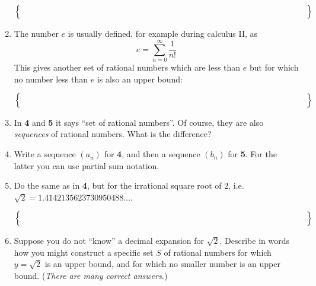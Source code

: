 \documentclass[11pt]{amsart}
\begin{document}
\begin{enumerate}[leftmargin=-1mm]
$$\Big\{ \hspace{5.0in} \Big\}$$
\vfill
\item The number $e$ is usually defined, for example during calculus II, as
	$$e = \sum_{n=0}^\infty \frac{1}{n!}$$
This gives another set of rational numbers which are less than $e$ but for which no number less than $e$ is also an upper bound:

$$\Big\{ \hspace{5.0in} \Big\}$$
\vfill
\clearpage\newpage
\item In \textbf{4} and \textbf{5} it says ``set of rational numbers''.  Of course, they are also \emph{sequences} of rational numbers.  What is the difference?

\vspace{1.0in}
\item Write a sequence $(a_n)$ for \textbf{4}, and then a sequence $(b_n)$ for \textbf{5}.  For the latter you can use partial sum notation.
\vfill
\item Do the same as in \textbf{4}, but for the irrational square root of $2$, i.e.~$\sqrt{2} = 1.4142135623730950488\dots$.

$$\Big\{ \hspace{5.0in} \Big\}$$

\bigskip
\item Suppose you do not ``know'' a decimal expansion for $\sqrt{2}$.  Describe in words how you might construct a specific set $S$ of rational numbers for which $y=\sqrt{2}$ is an upper bound, and for which no smaller number is an upper bound.  (\emph{There are many correct answers.})
\vfill
\end{enumerate}
\end{document}
